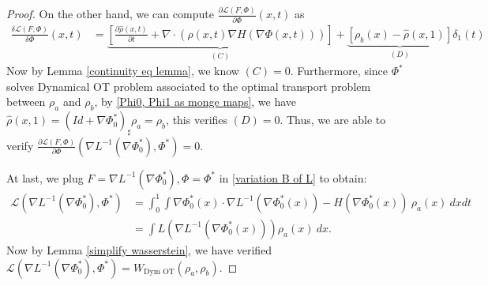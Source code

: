 \documentclass{article}
\begin{document}
\begin{proof}
  On the other hand, we can compute $\frac{\partial\mathcal{L}( {F}, \Phi)}{\partial \Phi}(x,t)$ as 
  \begin{align*}
     \frac{\delta\mathcal{L}( {F}, \Phi)}{\delta \Phi}(x,t) & = \underbrace{\left[\frac{\partial \hat{\rho}(x,t)}{\partial t} +\nabla\cdot(\hat{\rho}(x,t)\nabla H(\nabla\Phi(x,t)))\right]}_{(C)} + \underbrace{[\rho_b(x)-\hat{\rho}(x,1)]}_{(D)} \delta_1(t) %
  \end{align*}
  Now by Lemma \ref{continuity eq lemma}, we know $(C)=0$.
   Furthermore, since $\Phi^*$ solves Dynamical OT problem associated to the optimal transport problem between $\rho_a$ and $\rho_b$, by \eqref{Phi0, Phi1 as monge maps}, we have $\hat{\rho}(x,1) = (Id+\nabla\Phi^*_0)_{\sharp}\rho_a = \rho_b$, this verifies $(D) = 0$. Thus, we are able to verify $\frac{\partial \mathcal{L}( {F}, \Phi)}{\partial \Phi}( \nabla L^{-1}(\nabla \Phi^*_0), \Phi^* ) = 0$.
   
   At last, we plug $ {F}=\nabla L^{-1}(\nabla\Phi^*_0),\Phi = \Phi^*$ in \eqref{variation B of L} to obtain:
   \begin{align*}
      \mathcal{L}(\nabla L^{-1}(\nabla\Phi^*_0), \Phi^*) & = \int_0^1\int \nabla\Phi^*_0(x)\cdot\nabla L^{-1}(\nabla \Phi^*_0(x)) - H(\nabla\Phi^*_0(x)) ~\rho_a(x) ~dxdt \\
     & = \int L(\nabla L^{-1}(\nabla\Phi^*_0(x)))\rho_a(x)~dx.
   \end{align*}
   Now by Lemma \ref{simplify wasserstein}, we have verified $\mathcal{L}(\nabla L^{-1}(\nabla\Phi^*_0), \Phi^*)=W_{\textrm{Dym OT}}(\rho_a,\rho_b)$.
\end{proof}
\end{document}
